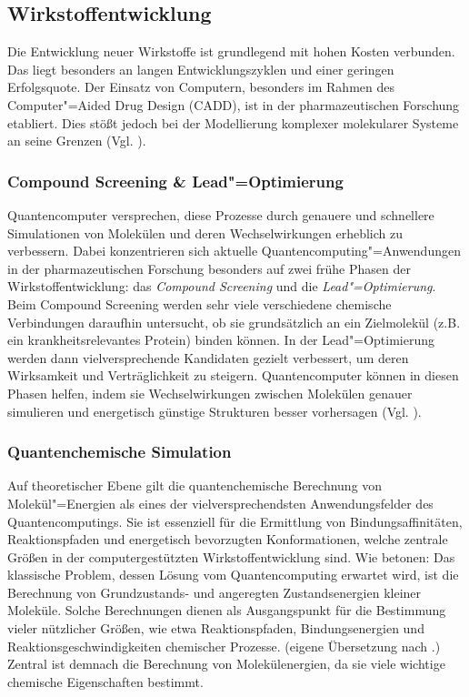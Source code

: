 \subsection{Wirkstoffentwicklung}
Die Entwicklung neuer Wirkstoffe ist grundlegend mit hohen Kosten verbunden. Das liegt besonders an langen Entwicklungszyklen und einer geringen Erfolgsquote. Der Einsatz von Computern, besonders im Rahmen des Computer"=Aided Drug Design (CADD), ist in der pharmazeutischen Forschung etabliert. Dies stößt jedoch bei der Modellierung komplexer molekularer Systeme an seine Grenzen (Vgl. \cite{bertl_quantum_2025}).

\subsubsection*{Compound Screening \& Lead"=Optimierung}
Quantencomputer versprechen, diese Prozesse durch genauere und schnellere Simulationen von Molekülen und deren Wechselwirkungen erheblich zu verbessern. Dabei konzentrieren sich aktuelle Quantencomputing"=Anwendungen in der pharmazeutischen Forschung besonders auf zwei frühe Phasen der Wirkstoffentwicklung: das \textit{Compound Screening} und die \textit{Lead"=Optimierung}. Beim Compound Screening werden sehr viele verschiedene chemische Verbindungen daraufhin untersucht, ob sie grundsätzlich an ein Zielmolekül (z.B. ein krankheitsrelevantes Protein) binden können. In der Lead"=Optimierung werden dann vielversprechende Kandidaten gezielt verbessert, um deren Wirksamkeit und Verträglichkeit zu steigern. Quantencomputer können in diesen Phasen helfen, indem sie Wechselwirkungen zwischen Molekülen genauer simulieren und energetisch günstige Strukturen besser vorhersagen (Vgl. \cite{zinner_quantum_2021}).

\subsubsection*{Quantenchemische Simulation}
Auf theoretischer Ebene gilt die quantenchemische Berechnung von Molekül"=Energien als eines der vielversprechendsten Anwendungsfelder des Quantencomputings. Sie ist essenziell für die Ermittlung von Bindungsaffinitäten, Reaktionspfaden und energetisch bevorzugten Konformationen, welche zentrale Größen in der computergestützten Wirkstoffentwicklung sind. Wie \cite{cao_quantum_2019} betonen: Das klassische Problem, dessen Lösung vom Quantencomputing erwartet wird, ist die Berechnung von Grundzustands- und angeregten Zustandsenergien kleiner Moleküle. Solche Berechnungen dienen als Ausgangspunkt für die Bestimmung vieler nützlicher Größen, wie etwa Reaktionspfaden, Bindungsenergien und Reaktionsgeschwindigkeiten chemischer Prozesse. (eigene Übersetzung nach \cite{cao_quantum_2019}.) Zentral ist demnach die Berechnung von Molekülenergien, da sie viele wichtige chemische Eigenschaften bestimmt.

